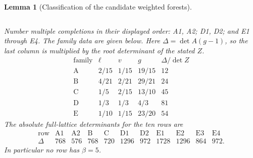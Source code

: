 \documentclass[11pt,reqno]{amsart}
\newtheorem{lemma}[lemma]{Lemma}
\theoremstyle{definition}
\theoremstyle{remark}
\numberwithin{equation}{section}
\begin{document}
\begin{lemma}[Classification of the candidate weighted forests]
\begin{center}
\begin{tabular}{ccll}
\end{tabular}
\end{center}
Number multiple completions in their displayed order: A1, A2; D1, D2;
and E1 through E4. The family data are given below.  Here $\Delta=\det A(g-1)$, so the
last column is multiplied by the root determinant of the stated $Z$.
\[
\begin{array}{c|cccc}
\text{family}&\ell&v&g&\Delta/\det Z\\\hline
\mathrm A&2/15&1/15&19/15&12\\
\mathrm B&4/21&2/21&29/21&24\\
\mathrm C&1/5&2/15&13/10&45\\
\mathrm D&1/3&1/3&4/3&81\\
\mathrm E&1/10&1/15&23/20&54
\end{array}
\]
The absolute full-lattice determinants for the ten rows
are
\[
\begin{array}{c|rrrrrrrrrr}
\text{row}&\mathrm{A1}&\mathrm{A2}&\mathrm B&\mathrm C&\mathrm{D1}&\mathrm{D2}&\mathrm{E1}&\mathrm{E2}&\mathrm{E3}&\mathrm{E4}\\\hline
\Delta&768&576&768&720&1296&972&1728&1296&864&972.
\end{array}
\]
In particular no row has $\beta=5$.
\end{lemma}
\end{document}

